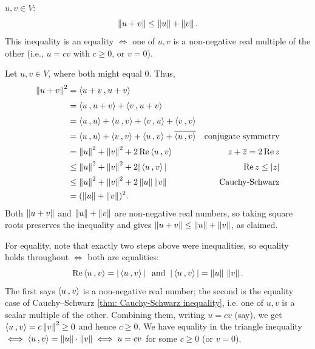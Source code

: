 \setcounter{thm}{16}
\begin{thm}
  $u,v \in V:$
  \begin{equation}
    \left \lVert u+v \right \rVert \leq \left \lVert u \right \rVert + \left \lVert v \right \rVert.
  \end{equation}
  This inequality is an equality $\iff$ one of $u, v$ is a non-negative real multiple of the other (i.e., $u = cv$ with $c \geq 0$, or $v = 0$).
\end{thm}
\begin{minipage}{\linewidth-30pt}
\begin{prf} Let $u,v \in V$, where both might equal $0$. Thus,
    \begin{equation}
      \begin{aligned}
        \norm{u+v}^2
        &=    \ip{u+v}{u+v} & \\
        &=    \ip{u}{u+v}+\ip{v}{u+v} & \\
        &=    \ip{u}{u}+\ip{u}{v}+\ip{v}{u}+\ip{v}{v} & \\
        &=    \ip{u}{u}+\ip{v}{v}+\ip{u}{v}+\overline{\ip{u}{v}} & \text{conjugate symmetry}\\
        &=    \norm{u}^2+\norm{v}^2+2\realpart \ip{u}{v} & \text{$z+\overline{z} = 2\realpart z$}\\
        &\leq \norm{u}^2+\norm{v}^2+2|\ip{u}{v}| & \text{$\realpart z \leq |z|$} \\
        &\leq \norm{u}^2+\norm{v}^2+2\norm{u}\norm{v} & \text{Cauchy-Schwarz} \\
        &=    (\norm{u} + \norm{v})^2. &
      \end{aligned}
    \end{equation}
Both $\left \lVert u+v \right \rVert$ and $\left \lVert u \right \rVert+\left \lVert v \right \rVert$ are non-negative real numbers, so taking square roots preserves the inequality and gives $\left \lVert u+v \right \rVert \leq \left \lVert u \right \rVert+\left \lVert v \right \rVert$, as claimed.

For equality, note that exactly two steps above were inequalities, so equality holds throughout $\iff$ both are equalities:
\begin{equation}
  \realpart \ip{u}{v} = |\ip{u}{v}| \myand |\ip{u}{v}| = \norm{u} \, \norm{v}.
\end{equation}
The first says $\ip{u}{v}$ is a non-negative real number; the second is the equality case of Cauchy--Schwarz \ref{thm: Cauchy-Schwarz inequality}, i.e. one of $u,v$ is a scalar multiple of the other. Combining them, writing $u = cv$ (say), we get $\ip{u}{v} = c \norm{v}^2 \geq 0$ and hence $c \geq 0$.
We have equality in the triangle inequality $\iff \ip{u}{v} = \norm{u}\cdot\norm{v} \iff u = c v$ for some $c \geq 0$ (or $v = 0$).
\end{prf}
\end{minipage}

\phantom{.}
